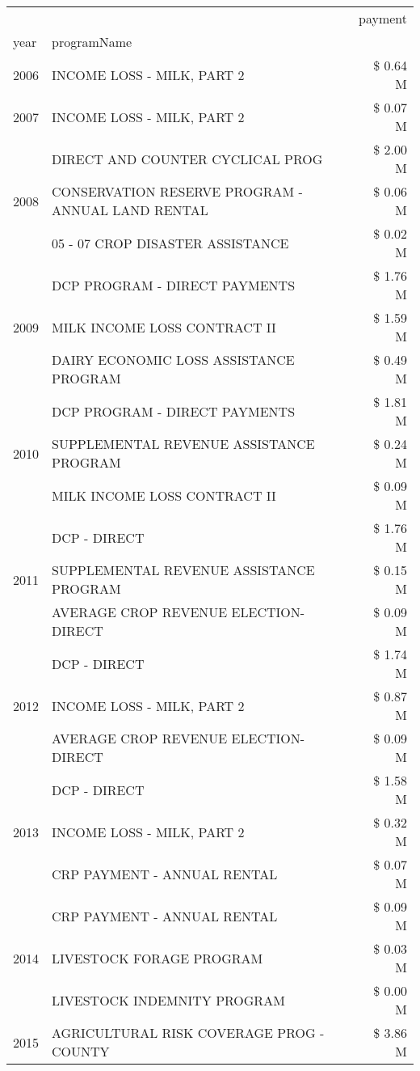 \begin{tabular}{llr}
\toprule
 &  & payment \\
year & programName &  \\
\midrule
2006 & INCOME LOSS - MILK, PART 2 & \$ 0.64 M \\
\cline{1-3}
2007 & INCOME LOSS - MILK, PART 2 & \$ 0.07 M \\
\cline{1-3}
\multirow[t]{3}{*}{2008} & DIRECT AND COUNTER CYCLICAL PROG & \$ 2.00 M \\
 & CONSERVATION RESERVE PROGRAM - ANNUAL LAND RENTAL & \$ 0.06 M \\
 & 05 - 07 CROP DISASTER ASSISTANCE & \$ 0.02 M \\
\cline{1-3}
\multirow[t]{3}{*}{2009} & DCP PROGRAM - DIRECT PAYMENTS & \$ 1.76 M \\
 & MILK INCOME LOSS CONTRACT II & \$ 1.59 M \\
 & DAIRY ECONOMIC LOSS ASSISTANCE PROGRAM & \$ 0.49 M \\
\cline{1-3}
\multirow[t]{3}{*}{2010} & DCP PROGRAM - DIRECT PAYMENTS & \$ 1.81 M \\
 & SUPPLEMENTAL REVENUE ASSISTANCE PROGRAM & \$ 0.24 M \\
 & MILK INCOME LOSS CONTRACT II & \$ 0.09 M \\
\cline{1-3}
\multirow[t]{3}{*}{2011} & DCP - DIRECT & \$ 1.76 M \\
 & SUPPLEMENTAL REVENUE ASSISTANCE PROGRAM & \$ 0.15 M \\
 & AVERAGE CROP REVENUE ELECTION-DIRECT & \$ 0.09 M \\
\cline{1-3}
\multirow[t]{3}{*}{2012} & DCP - DIRECT & \$ 1.74 M \\
 & INCOME LOSS - MILK, PART 2 & \$ 0.87 M \\
 & AVERAGE CROP REVENUE ELECTION-DIRECT & \$ 0.09 M \\
\cline{1-3}
\multirow[t]{3}{*}{2013} & DCP - DIRECT & \$ 1.58 M \\
 & INCOME LOSS - MILK, PART 2 & \$ 0.32 M \\
 & CRP PAYMENT - ANNUAL RENTAL & \$ 0.07 M \\
\cline{1-3}
\multirow[t]{3}{*}{2014} & CRP PAYMENT - ANNUAL RENTAL & \$ 0.09 M \\
 & LIVESTOCK FORAGE PROGRAM & \$ 0.03 M \\
 & LIVESTOCK INDEMNITY PROGRAM & \$ 0.00 M \\
\cline{1-3}
\multirow[t]{3}{*}{2015} & AGRICULTURAL RISK COVERAGE PROG - COUNTY & \$ 3.86 M \\

\end{tabular}
